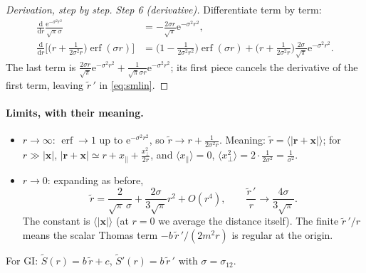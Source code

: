 \documentclass[11pt,a4paper]{article}
\numberwithin{equation}{section}
\theoremstyle{definition}
\theoremstyle{plain}
\theoremstyle{remark}
\numberwithin{algorithm}{section}
\newcommand{\vr}{\bm r}
\newcommand{\dd}{\mathrm{d}}
\newcommand{\ee}{\mathrm{e}}
\newcommand{\erf}{\operatorname{erf}}
\begin{document}
\begin{proof}[Derivation, step by step]
\emph{Step 6 (derivative).} Differentiate term by term:
\begin{align*}
\frac{\dd}{\dd r}\frac{\ee^{-\sigma^2r^2}}{\sqrt\pi\sigma}&=-\frac{2\sigma r}{\sqrt\pi}\ee^{-\sigma^2r^2},\\
\frac{\dd}{\dd r}\Big[\Big(r+\frac{1}{2\sigma^2r}\Big)\erf(\sigma r)\Big]&=\Big(1-\frac1{2\sigma^2r^2}\Big)\erf(\sigma r)+\Big(r+\frac1{2\sigma^2r}\Big)\frac{2\sigma}{\sqrt\pi}\ee^{-\sigma^2r^2}.
\end{align*}
The last term is $\frac{2\sigma r}{\sqrt\pi}\ee^{-\sigma^2r^2}+\frac{1}{\sqrt\pi\sigma r}\ee^{-\sigma^2r^2}$; its first piece cancels the derivative of the first term, leaving $\tilde r\,'$ in \eqref{eq:smlin}.
\end{proof}

\paragraph{Limits, with their meaning.}
\begin{itemize}[leftmargin=1.3em,itemsep=2pt]
\item $r\to\infty$: $\erf\to1$ up to $\ee^{-\sigma^2r^2}$, so $\tilde r\to r+\frac{1}{2\sigma^2r}$. Meaning: $\tilde r=\langle|\vr+\bm x|\rangle$; for $r\gg|\bm x|$, $|\vr+\bm x|\simeq r+x_\parallel+\frac{x_\perp^2}{2r}$, and $\langle x_\parallel\rangle=0$, $\langle x_\perp^2\rangle=2\cdot\frac1{2\sigma^2}=\frac1{\sigma^2}$.
\item $r\to0$: expanding as before,
\begin{equation}
\tilde r=\frac{2}{\sqrt\pi\,\sigma}+\frac{2\sigma}{3\sqrt\pi}r^2+O(r^4),\qquad \frac{\tilde r\,'}{r}\to\frac{4\sigma}{3\sqrt\pi}.
\end{equation}
The constant is $\langle|\bm x|\rangle$ (at $r=0$ we average the distance itself). The finite $\tilde r\,'/r$ means the scalar Thomas term $-b\,\tilde r\,'/(2m^2r)$ is regular at the origin.
\end{itemize}
For GI: $\tilde S(r)=b\,\tilde r+c$, $\tilde S'(r)=b\,\tilde r\,'$ with $\sigma=\sigma_{12}$.
\end{document}

